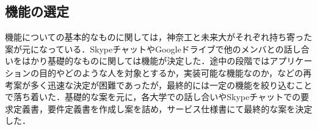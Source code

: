 \subsection{機能の選定}
\par
機能についての基本的なものに関しては，神奈工と未来大がそれぞれ持ち寄った案が元になっている．SkypeチャットやGoogleドライブで他のメンバとの話し合いをはかり基礎的なものに関しては機能が決定した．途中の段階ではアプリケーションの目的やどのような人を対象とするか，実装可能な機能なのか，などの再考案が多く迅速な決定が困難であったが，最終的には一定の機能を絞り込むことで落ち着いた．基礎的な案を元に，各大学での話し合いやSkypeチャットでの要求定義書，要件定義書を作成し案を詰め，サービス仕様書にて最終的な案を決定した．
